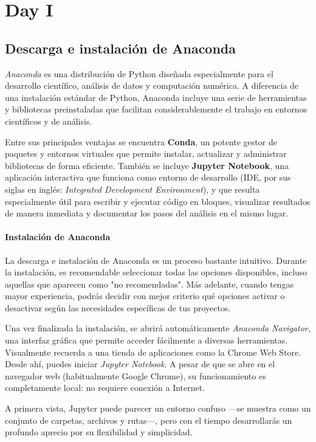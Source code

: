\documentclass{article}
\theoremstyle{nonumberplain}
\begin{document}
\section*{Day I}
\subsection*{Descarga e instalación de Anaconda}

\textit{Anaconda} es una distribución de Python diseñada especialmente para el desarrollo científico, análisis de datos y computación numérica. A diferencia de una instalación estándar de Python, Anaconda incluye una serie de herramientas y bibliotecas preinstaladas que facilitan considerablemente el trabajo en entornos científicos y de análisis.

Entre sus principales ventajas se encuentra \textbf{Conda}, un potente gestor de paquetes y entornos virtuales que permite instalar, actualizar y administrar bibliotecas de forma eficiente. También se incluye \textbf{Jupyter Notebook}, una aplicación interactiva que funciona como entorno de desarrollo (IDE, por sus siglas en inglés: \textit{Integrated Development Environment}), y que resulta especialmente útil para escribir y ejecutar código en bloques, visualizar resultados de manera inmediata y documentar los pasos del análisis en el mismo lugar.

\paragraph{Instalación de Anaconda}
La descarga e instalación de Anaconda es un proceso bastante intuitivo. Durante la instalación, es recomendable seleccionar todas las opciones disponibles, incluso aquellas que aparecen como "no recomendadas". Más adelante, cuando tengas mayor experiencia, podrás decidir con mejor criterio qué opciones activar o desactivar según las necesidades específicas de tus proyectos.

Una vez finalizada la instalación, se abrirá automáticamente \textit{Anaconda Navigator}, una interfaz gráfica que permite acceder fácilmente a diversas herramientas. Visualmente recuerda a una tienda de aplicaciones como la Chrome Web Store. Desde ahí, puedes iniciar \textit{Jupyter Notebook}. A pesar de que se abre en el navegador web (habitualmente Google Chrome), su funcionamiento es completamente local: no requiere conexión a Internet.

A primera vista, Jupyter puede parecer un entorno confuso —se muestra como un conjunto de carpetas, archivos y rutas—, pero con el tiempo desarrollarás un profundo aprecio por su flexibilidad y simplicidad.
\end{document}
